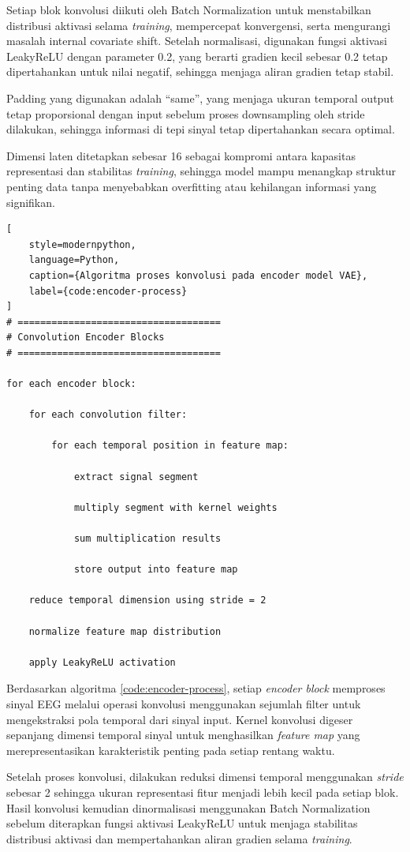 Setiap blok konvolusi diikuti oleh Batch Normalization untuk menstabilkan distribusi aktivasi selama \textit{training}, mempercepat konvergensi, serta mengurangi masalah internal covariate shift. Setelah normalisasi, digunakan fungsi aktivasi LeakyReLU dengan parameter 0.2, yang berarti gradien kecil sebesar 0.2 tetap dipertahankan untuk nilai negatif, sehingga menjaga aliran gradien tetap stabil.

Padding yang digunakan adalah “same”, yang menjaga ukuran temporal output tetap proporsional dengan input sebelum proses downsampling oleh stride dilakukan, sehingga informasi di tepi sinyal tetap dipertahankan secara optimal.

Dimensi laten ditetapkan sebesar 16 sebagai kompromi antara kapasitas representasi dan stabilitas \textit{training}, sehingga model mampu menangkap struktur penting data tanpa menyebabkan overfitting atau kehilangan informasi yang signifikan.
\begin{lstlisting}[
    style=modernpython,
    language=Python,
    caption={Algoritma proses konvolusi pada encoder model VAE},
    label={code:encoder-process}
]
# ====================================
# Convolution Encoder Blocks
# ====================================

for each encoder block:

    for each convolution filter:

        for each temporal position in feature map:

            extract signal segment

            multiply segment with kernel weights

            sum multiplication results

            store output into feature map

    reduce temporal dimension using stride = 2

    normalize feature map distribution

    apply LeakyReLU activation
\end{lstlisting}

Berdasarkan algoritma \ref{code:encoder-process}, setiap \textit{encoder block} memproses sinyal EEG melalui operasi konvolusi menggunakan sejumlah filter untuk mengekstraksi pola temporal dari sinyal input. Kernel konvolusi digeser sepanjang dimensi temporal sinyal untuk menghasilkan \textit{feature map} yang merepresentasikan karakteristik penting pada setiap rentang waktu.

Setelah proses konvolusi, dilakukan reduksi dimensi temporal menggunakan \textit{stride} sebesar 2 sehingga ukuran representasi fitur menjadi lebih kecil pada setiap blok. Hasil konvolusi kemudian dinormalisasi menggunakan Batch Normalization sebelum diterapkan fungsi aktivasi LeakyReLU untuk menjaga stabilitas distribusi aktivasi dan mempertahankan aliran gradien selama \textit{training}.


